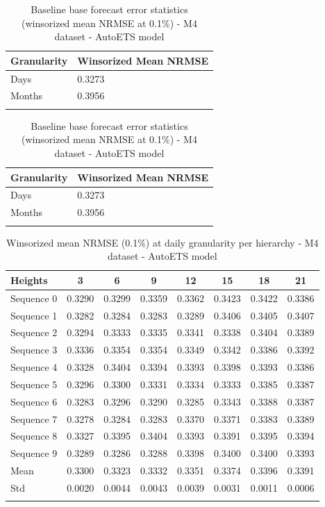 \begin{table}[h]
\caption{Baseline base forecast error statistics (winsorized mean NRMSE at 0.1\%) - M4 dataset - AutoETS model}\label{tab:baseline_M4_AutoETS}
\begin{tabular}{@{}ll@{}}
\toprule
Granularity & Winsorized Mean NRMSE \\
\midrule
Days & 0.3273 \\
Months & 0.3956 \\
\botrule
\end{tabular}
\end{table}


\begin{table}[h]
\caption{Baseline base forecast error statistics (winsorized mean NRMSE at 0.1\%) - M4 dataset - AutoETS model}\label{tab:baseline_M4_AutoETS}
\begin{tabular}{@{}ll@{}}
\toprule
Granularity & Winsorized Mean NRMSE \\
\midrule
Days & 0.3273 \\
Months & 0.3956 \\
\botrule
\end{tabular}
\end{table}


\begin{table}[h]
\caption{Winsorized mean NRMSE (0.1\%) at daily granularity per hierarchy - M4 dataset - AutoETS model}\label{tab:day_mean_M4_AutoETS}
\begin{tabular*}{\textwidth}{@{\extracolsep\fill}lccccccc}
\toprule
Heights & 3 & 6 & 9 & 12 & 15 & 18 & 21 \\
\midrule
Sequence 0 & 0.3290 & 0.3299 & 0.3359 & 0.3362 & 0.3423 & 0.3422 & 0.3386 \\
Sequence 1 & 0.3282 & 0.3284 & 0.3283 & 0.3289 & 0.3406 & 0.3405 & 0.3407 \\
Sequence 2 & 0.3294 & 0.3333 & 0.3335 & 0.3341 & 0.3338 & 0.3404 & 0.3389 \\
Sequence 3 & 0.3336 & 0.3354 & 0.3354 & 0.3349 & 0.3342 & 0.3386 & 0.3392 \\
Sequence 4 & 0.3328 & 0.3404 & 0.3394 & 0.3393 & 0.3398 & 0.3393 & 0.3386 \\
Sequence 5 & 0.3296 & 0.3300 & 0.3331 & 0.3334 & 0.3333 & 0.3385 & 0.3387 \\
Sequence 6 & 0.3283 & 0.3296 & 0.3290 & 0.3285 & 0.3343 & 0.3388 & 0.3387 \\
Sequence 7 & 0.3278 & 0.3284 & 0.3283 & 0.3370 & 0.3371 & 0.3383 & 0.3389 \\
Sequence 8 & 0.3327 & 0.3395 & 0.3404 & 0.3393 & 0.3391 & 0.3395 & 0.3394 \\
Sequence 9 & 0.3289 & 0.3286 & 0.3288 & 0.3398 & 0.3400 & 0.3400 & 0.3393 \\
\midrule
Mean & 0.3300 & 0.3323 & 0.3332 & 0.3351 & 0.3374 & 0.3396 & 0.3391 \\
Std & 0.0020 & 0.0044 & 0.0043 & 0.0039 & 0.0031 & 0.0011 & 0.0006 \\
\botrule
\end{tabular*}
\end{table}


